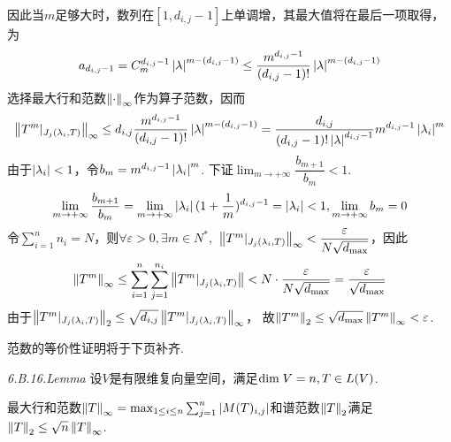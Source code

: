 因此当\(m\)足够大时，数列在\([1,d_{i,j}-1]\)上单调增，其最大值将在最后一项取得，为
    \begin{align*}
        a_{d_{i,j}-1}=C_m^{d_{i,j}-1}\left\lvert \lambda \right\rvert^{m-(d_{i,j}-1)} \leq 
        \dfrac{m^{d_{i,j}-1}}{(d_{i,j}-1)!}\left\lvert \lambda \right\rvert^{m-(d_{i,j}-1)}
    \end{align*}
选择最大行和范数\(\left\lVert \cdot \right\rVert_{\infty}\)作为算子范数，因而
    \begin{align*}
        \left\lVert T^m|_{J_j(\lambda_i,T)} \right\rVert_{\infty} \leq d_{i,j}\dfrac{m^{d_{i,j}-1}}{(d_{i,j}-1)!}\left\lvert \lambda \right\rvert^{m-(d_{i,j}-1)}
        =\dfrac{d_{i,j}}{(d_{i,j}-1)! \left\lvert \lambda \right\rvert^{d_{i,j}-1}}m^{d_{i,j}-1}\left\lvert \lambda_i \right\rvert^m
    \end{align*}
由于\(\left\lvert \lambda_i \right\rvert<1\)，令\(b_m=m^{d_{i,j}-1}\left\lvert \lambda_i \right\rvert^m\).
下证\(\lim_{m \rightarrow +\infty} \dfrac{b_{m+1}}{b_m}<1\).
    \begin{align*}
        \lim_{m \rightarrow +\infty} \dfrac{b_{m+1}}{b_m}
        =\lim_{m \rightarrow +\infty} \left\lvert \lambda_i \right\rvert(1+\dfrac{1}{m})^{d_{i,j}-1}=\left\lvert \lambda_i \right\rvert<1,
        \lim_{m \rightarrow +\infty} b_m=0
    \end{align*}
令\(\sum_{i=1}^n n_i=N\)，则\(\forall \varepsilon>0,\exists m \in N^*,\)
\(\left\lVert T^m|_{J_j(\lambda_i,T)} \right\rVert_{\infty}<\dfrac{\varepsilon}{N \sqrt{d_{\max}}}\)，因此
    \begin{align*}
        \left\lVert T^m \right\rVert_{\infty} \leq \sum_{i=1}^n \sum_{j=1}^{n_i}\left\lVert T^m|_{J_j(\lambda_i,T)} \right\rVert<
        N \cdot \dfrac{\varepsilon}{N \sqrt{d_{\max}}}=\dfrac{\varepsilon}{\sqrt{d_{\max}}}
    \end{align*}
由于\(\left\lVert T^m|_{J_j(\lambda_i,T)} \right\rVert_2 \leq \sqrt{d_{i,j}}\left\lVert T^m|_{J_j(\lambda_i,T)} \right\rVert_{\infty}\)，
故\(\left\lVert T^m \right\rVert_2 \leq \sqrt{d_{\max}}\left\lVert T^m \right\rVert_{\infty}<\varepsilon\).

范数的等价性证明将于下页补齐.

\newpage

\textit{6.B.16.Lemma}
设\(V\)是有限维复向量空间，满足\(\mathrm{dim \;} V=n,T \in L(V)\).

最大行和范数\(\left\lVert T \right\rVert_{\infty}=\max_{1 \leq i \leq n} \sum_{j=1}^n \left\lvert M(T)_{i,j} \right\rvert\)和谱范数\(\left\lVert T \right\rVert_2\)满足
\(\left\lVert T \right\rVert_2 \leq \sqrt{n}\left\lVert T \right\rVert_{\infty}\).

